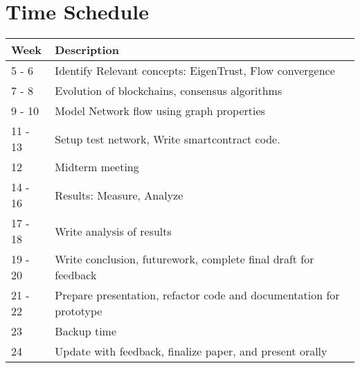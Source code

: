 \documentclass[a4paper,11pt,dvipsnames]{article}
\begin{document}
	\section*{Time Schedule}
	\vspace{1.5cm}
	\begin{center}
		\begin{tabular}{ |m{1.5cm}|m{30em} | } 
			\hline
			\textbf{Week} & \textbf{Description}\\
			\hline
			5 - 6 & Identify Relevant concepts: EigenTrust, Flow convergence \\
			7 - 8 & Evolution of blockchains, consensus algorithms \\
			9 - 10 & Model Network flow using graph properties \\
			11 - 13 & Setup test network, Write smartcontract code. \\
			12 & Midterm meeting \\
			14 - 16 & Results: Measure, Analyze \\
			17 - 18 & Write analysis of results \\
			19 - 20 & Write conclusion, futurework, complete final draft 
			for feedback \\
			21 - 22 & Prepare presentation, refactor code and documentation 
			for prototype \\
			23 & Backup time \\
			24 & Update with feedback, finalize paper, and present orally \\	
			\hline
		\end{tabular}
	\end{center}
\end{document}
